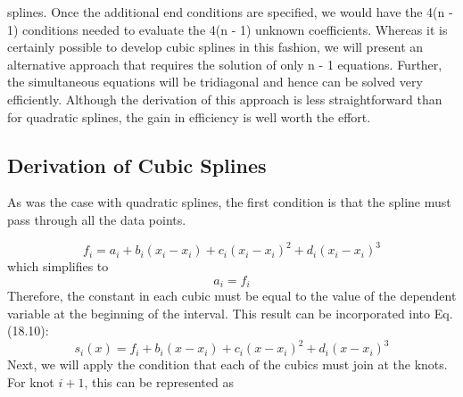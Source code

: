 \documentclass[../main.tex]{subfiles}
\begin{document}
    splines.
    Once the additional end conditions are specified, we would have the 4(n - 1) conditions needed to evaluate the 4(n - 1) unknown coefficients. Whereas it is certainly possible
    to develop cubic splines in this fashion, we will present an alternative approach that requires
    the solution of only n - 1 equations. Further, the simultaneous equations will be tridiagonal
    and hence can be solved very efficiently. Although the derivation of this approach is less
    straightforward than for quadratic splines, the gain in efficiency is well worth the effort.

    \subsection{Derivation of Cubic Splines}
 
    As was the case with quadratic splines, the first condition is that the spline must pass
    through all the data points.
    
    \begin{equation}
        \nonumber
f_{i}=a_{i}+b_{i}\left(x_{i}-x_{i}\right)+c_{i}\left(x_{i}-x_{i}\right)^{2}+d_{i}\left(x_{i}-x_{i}\right)^{3}
\end{equation}
which simplifies to
\begin{equation}
    \tag{18.11}
a_{i}=f_{i}
\end{equation}
Therefore, the constant in each cubic must be equal to the value of the dependent variable at the beginning of the interval. This result can be incorporated into Eq. (18.10):
\begin{equation}
    \tag{18.12}
s_{i}(x)=f_{i}+b_{i}\left(x-x_{i}\right)+c_{i}\left(x-x_{i}\right)^{2}+d_{i}\left(x-x_{i}\right)^{3}
\end{equation}
Next, we will apply the condition that each of the cubics must join at the knots. For knot $i+1$, this can be represented as
\end{document}
